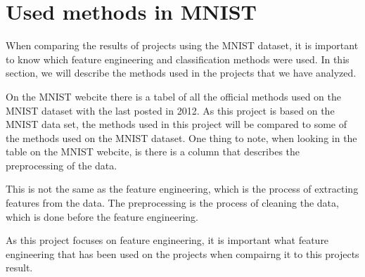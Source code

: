\section{Used methods in MNIST}\label{sec:method-MNIST}
When comparing the results of projects using the MNIST dataset, it is important to know which feature engineering and classification methods were used. In this section, we will describe the methods used in the projects that we have analyzed.

On the MNIST webcite \cite{MNIST} there is a tabel of all the official methods used on the MNIST dataset with the last posted in 2012. As this project is based on the MNIST data set, the methods used in this project will be compared to some of the methods used on the MNIST dataset. One thing to note, when looking in the table on the MNIST webcite, is there is a column that describes the preprocessing of the data.

This is not the same as the feature engineering, which is the process of extracting features from the data. The preprocessing is the process of cleaning the data, which is done before the feature engineering.

As this project focuses on feature engineering, it is important what feature engineering that has been used on the projects when compairng it to this projects result.




